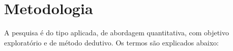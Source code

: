
\chapter{Metodologia}\label{cap:metodologia}


A pesquisa é do tipo aplicada, de abordagem quantitativa, com objetivo exploratório e de método dedutivo. Os termos são explicados abaixo:







